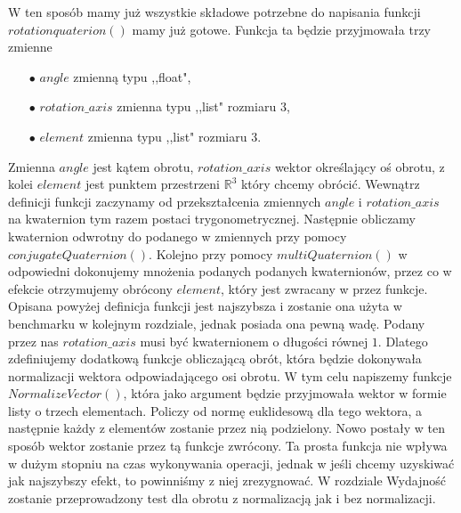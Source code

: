 \documentclass[a4paper,twoside,11pt,reqno]{mwrep}
\theoremstyle{plain} \newtheorem{twr}{Twierdzenie}
\theoremstyle{plain} \newtheorem{lem}{Lemat}
\theoremstyle{definition} \newtheorem{defi}{Definicja}
\theoremstyle{remark} \newtheorem*{wni}{Wniosek}
\theoremstyle{definition} \newtheorem{uwaga}{Uwaga}
\theoremstyle{definition}\newtheorem{prz}{Przykład}
\begin{document}
W ten sposób mamy już wszystkie składowe potrzebne do napisania funkcji $rotationquaterion()$ mamy już gotowe.
Funkcja ta będzie przyjmowała trzy zmienne
\begin{itemize}
\item[$\bullet$] $angle$ zmienną typu ,,float",
\item[$\bullet$] $rotation\_axis$ zmienna typu ,,list" rozmiaru $3$,
\item[$\bullet$] $element$ zmienna typu ,,list" rozmiaru $3$.
\end{itemize}  
Zmienna $angle$ jest kątem obrotu, $rotation\_axis$ wektor określający oś obrotu, 
z kolei $element$ jest punktem przestrzeni $\mathbb{R}^3$ który chcemy
obrócić. Wewnątrz definicji funkcji zaczynamy od przekształcenia zmiennych $angle$ i 
$rotation\_axis$ na kwaternion tym razem postaci trygonometrycznej.
Następnie obliczamy kwaternion odwrotny do podanego w zmiennych przy pomocy $conjugateQuaternion()$. Kolejno
przy pomocy $multiQuaternion()$ w odpowiedni dokonujemy mnożenia podanych 
podanych kwaternionów, przez co w efekcie otrzymujemy obrócony $element$, który jest zwracany w przez funkcje.
Opisana powyżej definicja funkcji jest najszybsza i zostanie ona użyta w benchmarku w kolejnym rozdziale,
jednak posiada ona pewną wadę. Podany przez nas $rotation\_axis$ musi być kwaternionem o długości równej $1$.
Dlatego zdefiniujemy dodatkową funkcje obliczającą obrót, która będzie dokonywała normalizacji wektora
odpowiadającego osi obrotu.
W tym celu napiszemy funkcje $NormalizeVector()$, która jako argument będzie przyjmowała wektor
w formie listy o trzech elementach. Policzy od normę euklidesową dla tego wektora, a następnie
każdy z elementów zostanie przez nią podzielony. Nowo postały w ten sposób wektor zostanie przez tą funkcje zwrócony.
Ta prosta funkcja nie wpływa w dużym stopniu na czas wykonywania operacji, jednak w 
jeśli chcemy uzyskiwać jak najszybszy efekt, to powinniśmy z niej zrezygnować.
W rozdziale Wydajność zostanie przeprowadzony test dla obrotu z normalizacją jak i bez normalizacji.
\end{document}
